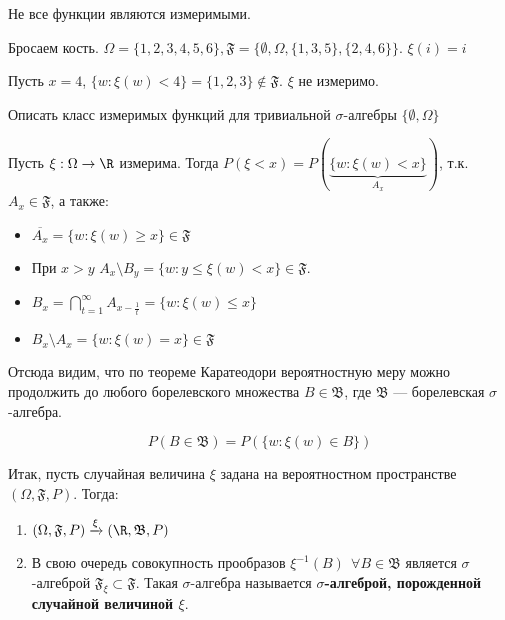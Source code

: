 \begin{remark}
    Не все функции являются измеримыми.
\end{remark}

\begin{example}
    Бросаем кость. \(\Omega = \{1, 2, 3, 4, 5, 6\}, \mathfrak{F} = \{\emptyset, \Omega, \{1, 3, 5\}, \{2, 4, 6\} \} \). \(\xi(i) = i\)

    Пусть \(x = 4\), \(\{w : \xi(w) < 4\} = \{1, 2, 3\} \notin \mathfrak{F}\). \(\xi\) не измеримо.
\end{example}

\begin{exercise}
    Описать класс измеримых функций для тривиальной \(\sigma\)-алгебры \(\{\emptyset, \Omega\}\)
\end{exercise}

Пусть \(\xi : \Omega \to \R\) измерима. Тогда \(P(\xi < x) = P(\underbrace{\{w : \xi(w) < x\}}_{A_x})\), т.к. \(A_x \in \mathfrak{F}\), а также:
\begin{itemize}
    \item \(\overline{A_x} = \{w : \xi(w) \geq x\} \in \mathfrak{F}\)
    \item При \(x > y\) \(A_x \setminus B_y = \{w : y \leq \xi(w) < x\} \in \mathfrak{F}\).
    \item \(B_x = \bigcap_{t = 1}^{\infty} A_{x - \frac{1}{t}} = \{w : \xi(w) \leq x\} \)
    \item \(B_x \setminus A_x = \{w : \xi(w) = x\} \in \mathfrak{F}\)
\end{itemize}

Отсюда видим, что по теореме Каратеодори вероятностную меру можно продолжить до любого борелевского множества \(B \in \mathfrak{B}\), где \(\mathfrak{B}\) --- борелевская \(\sigma\)-алгебра.

\[P(B \in \mathfrak{B}) = P(\{w : \xi(w) \in B\})\]

Итак, пусть случайная величина \(\xi\) задана на вероятностном пространстве \((\Omega, \mathfrak{F}, P)\). Тогда:
\begin{enumerate}
    \item \((\Omega, \mathfrak{F}, P) \xrightarrow{\xi} (\R, \mathfrak{B}, P)\)
    \item В свою очередь совокупность прообразов \(\xi^{ - 1}(B) \ \ \forall B\in \mathfrak{B}\) является \(\sigma\)-алгеброй \(\mathfrak{F}_\xi \subset \mathfrak{F}\). Такая \(\sigma\)-алгебра называется \textbf{\(\sigma\)-алгеброй, порожденной случайной величиной \(\xi\)}.
\end{enumerate}

